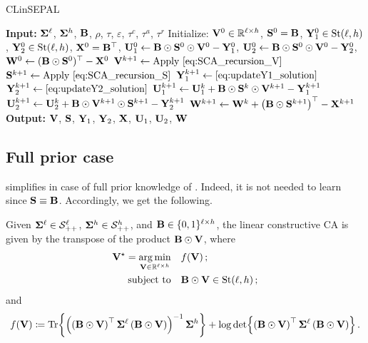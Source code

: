 \begin{algorithm}[H]
\caption{CLinSEPAL}
\label{alg:clinsepal}
\begin{algorithmic}[1]
\STATE \textbf{Input:} $\boldsymbol{\Sigma}^{\ell}$, $\boldsymbol{\Sigma}^{h}$, $\mathbf{B}$, $\rho$, $\tau$, $\varepsilon$, $\tau^c$, $\tau^a$, $\tau^r$
\STATE Initialize: $\mathbf{V}^0 \in \mathbb{R}^{\ell \times h}$, $\mathbf{S}^0 = \mathbf{B}$, $\mathbf{Y}_1^0 \in \mathrm{St}({\ell},{h})$, $\mathbf{Y}_2^0 \in \mathrm{St}({\ell},{h})$, $\mathbf{X}^0=\mathbf{B}^\top$, $\mathbf{U}_1^0 \gets \mathbf{B}\odot\mathbf{S}^0\odot\mathbf{V}^0 - \mathbf{Y}_1^0$, $\mathbf{U}_2^0 \gets \mathbf{B}\odot\mathbf{S}^0\odot\mathbf{V}^0 - \mathbf{Y}_2^0$, $\mathbf{W}^0 \gets (\mathbf{B} \odot \mathbf{S}^0)^\top - \mathbf{X}^0$
\REPEAT
    \STATE $\V^{k+1} \gets \text{Apply \cref{eq:SCA_recursion_V}}$ 
    \STATE $\Supp^{k+1} \gets \text{Apply \cref{eq:SCA_recursion_S}}$ 
    \STATE $\YO^{k+1} \gets \text{\cref{eq:updateY1_solution}}$
    \STATE $\YT^{k+1} \gets \text{\cref{eq:updateY2_solution}}$
    \STATE $\mathbf{U}_1^{k+1} \gets \mathbf{U}_1^k + \mathbf{B}\odot\mathbf{S}^{k}\odot\mathbf{V}^{k+1} - \mathbf{Y}_1^{k+1}$
    \STATE $\mathbf{U}_2^{k+1} \gets \mathbf{U}_2^k + \mathbf{B}\odot\mathbf{V}^{k+1}\odot\mathbf{S}^{k+1} - \mathbf{Y}_2^{k+1}$
    \STATE $\mathbf{W}^{k+1} \gets \mathbf{W}^k + \left(\mathbf{B} \odot \mathbf{S}^{k+1}\right)^\top - \mathbf{X}^{k+1}$
\STATE \textbf{Output:} $\mathbf{V}$, $\mathbf{S}$, $\mathbf{Y}_1$, $\mathbf{Y}_2$, $\mathbf{X}$, $\mathbf{U}_1$, $\mathbf{U}_2$, $\mathbf{W}$
\end{algorithmic}
\end{algorithm} 

\subsection{Full prior case}\label{subsec:CLinSEPAL_full_prior}
 simplifies in case of full prior knowledge of \B. 
Indeed, it is not needed to learn \Supp since $\mathbf{S} \equiv \mathbf{B}$.
Accordingly, we get the following.

\begin{problem}\label{prob:nonconvex_prob_full}
Given $\boldsymbol{\Sigma}^{\ell} \in \mathcal{S}_{++}^{\ell}$, $\boldsymbol{\Sigma}^{h} \in \mathcal{S}_{++}^{h}$, and $\mathbf{B} \in \{0,1\}^{\ell \times h}$, the linear constructive CA is given by the transpose of the product $\mathbf{B} \odot \mathbf{V}$, where 
    \begin{equation}\label{eq:prob_madmmsca_V}
        \begin{aligned}
            \mathbf{V}^\star = \operatorname*{arg\,min}_{\mathbf{V} \in \mathbb{R}^{\ell \times h}} &\quad f(\mathbf{V})\,;\\
             \textrm{subject to} & \quad \mathbf{B} \odot \mathbf{V} \in \mathrm{St}({\ell},{h})\,; \\
        \end{aligned}
    \end{equation}
    and
    \begin{equation}\label{eq:objective_full_knowledge}
        f(\V) \coloneqq \Tr{\left(\left(\B \odot \V\right)^\top \covlow \left(\B \odot \V\right) \right)^{-1} \covhigh} + \log\det {\left(\B \odot\V\right)^\top \covlow \left(\B \odot\V\right) }\,.
    \end{equation}
\end{problem}

